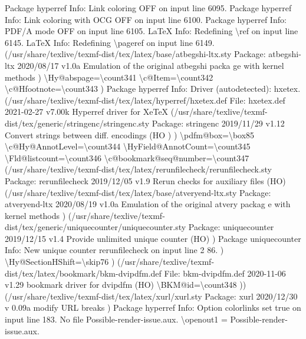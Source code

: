 \documentclass[
  letterpaper,
  DIV=11,
  numbers=noendperiod]{scrartcl}
\newenvironment{Shaded}{\begin{snugshade}}{\end{snugshade}}
\newcommand{\NormalTok}[1]{\textcolor[rgb]{0.00,0.23,0.31}{#1}}
\begin{document}
\begin{Shaded}
\begin{Highlighting}[]
\NormalTok{Package hyperref Info: Link coloring OFF on input line 6095.}
\NormalTok{Package hyperref Info: Link coloring with OCG OFF on input line 6100.}
\NormalTok{Package hyperref Info: PDF/A mode OFF on input line 6105.}
\NormalTok{LaTeX Info: Redefining \textbackslash{}ref on input line 6145.}
\NormalTok{LaTeX Info: Redefining \textbackslash{}pageref on input line 6149.}
\NormalTok{(/usr/share/texlive/texmf{-}dist/tex/latex/base/atbegshi{-}ltx.sty}
\NormalTok{Package: atbegshi{-}ltx 2020/08/17 v1.0a Emulation of the original atbegshi packa}
\NormalTok{ge}
\NormalTok{with kernel methods}
\NormalTok{)}
\NormalTok{\textbackslash{}Hy@abspage=\textbackslash{}count341}
\NormalTok{\textbackslash{}c@Item=\textbackslash{}count342}
\NormalTok{\textbackslash{}c@Hfootnote=\textbackslash{}count343}
\NormalTok{)}
\NormalTok{Package hyperref Info: Driver (autodetected): hxetex.}
\NormalTok{(/usr/share/texlive/texmf{-}dist/tex/latex/hyperref/hxetex.def}
\NormalTok{File: hxetex.def 2021{-}02{-}27 v7.00k Hyperref driver for XeTeX}
\NormalTok{(/usr/share/texlive/texmf{-}dist/tex/generic/stringenc/stringenc.sty}
\NormalTok{Package: stringenc 2019/11/29 v1.12 Convert strings between diff. encodings (HO}
\NormalTok{)}
\NormalTok{)}
\NormalTok{\textbackslash{}pdfm@box=\textbackslash{}box85}
\NormalTok{\textbackslash{}c@Hy@AnnotLevel=\textbackslash{}count344}
\NormalTok{\textbackslash{}HyField@AnnotCount=\textbackslash{}count345}
\NormalTok{\textbackslash{}Fld@listcount=\textbackslash{}count346}
\NormalTok{\textbackslash{}c@bookmark@seq@number=\textbackslash{}count347}
\NormalTok{(/usr/share/texlive/texmf{-}dist/tex/latex/rerunfilecheck/rerunfilecheck.sty}
\NormalTok{Package: rerunfilecheck 2019/12/05 v1.9 Rerun checks for auxiliary files (HO)}
\NormalTok{(/usr/share/texlive/texmf{-}dist/tex/latex/base/atveryend{-}ltx.sty}
\NormalTok{Package: atveryend{-}ltx 2020/08/19 v1.0a Emulation of the original atvery packag}
\NormalTok{e}
\NormalTok{with kernel methods}
\NormalTok{) (/usr/share/texlive/texmf{-}dist/tex/generic/uniquecounter/uniquecounter.sty}
\NormalTok{Package: uniquecounter 2019/12/15 v1.4 Provide unlimited unique counter (HO)}
\NormalTok{)}
\NormalTok{Package uniquecounter Info: New unique counter \textasciigrave{}rerunfilecheck\textquotesingle{} on input line 2}
\NormalTok{86.}
\NormalTok{)}
\NormalTok{\textbackslash{}Hy@SectionHShift=\textbackslash{}skip76}
\NormalTok{) (/usr/share/texlive/texmf{-}dist/tex/latex/bookmark/bkm{-}dvipdfm.def}
\NormalTok{File: bkm{-}dvipdfm.def 2020{-}11{-}06 v1.29 bookmark driver for dvipdfm (HO)}
\NormalTok{\textbackslash{}BKM@id=\textbackslash{}count348}
\NormalTok{)) (/usr/share/texlive/texmf{-}dist/tex/latex/xurl/xurl.sty}
\NormalTok{Package: xurl 2020/12/30 v 0.09a modify URL breaks}
\NormalTok{)}
\NormalTok{Package hyperref Info: Option \textasciigrave{}colorlinks\textquotesingle{} set \textasciigrave{}true\textquotesingle{} on input line 183.}
\NormalTok{No file Possible{-}render{-}issue.aux.}
\NormalTok{\textbackslash{}openout1 = \textasciigrave{}Possible{-}render{-}issue.aux\textquotesingle{}.}


\end{Highlighting}
\end{Shaded}
\end{document}
